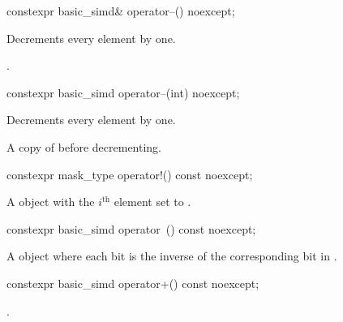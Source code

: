 \begin{itemdecl}
constexpr basic_simd& operator--() noexcept;
\end{itemdecl}

\begin{itemdescr}
  \pnum{}

  \pnum\effects
  Decrements every element by one.

  \pnum\returns
  .
\end{itemdescr}

\begin{itemdecl}
constexpr basic_simd operator--(int) noexcept;
\end{itemdecl}

\begin{itemdescr}
  \pnum{}

  \pnum\effects
  Decrements every element by one.

  \pnum\returns
  A copy of  before decrementing.
\end{itemdescr}

\begin{itemdecl}
constexpr mask_type operator!() const noexcept;
\end{itemdecl}

\begin{itemdescr}
  \pnum{}

  \pnum\returns
  A  object with the $i^\text{th}$ element set to  \foralli.
\end{itemdescr}

\begin{itemdecl}
constexpr basic_simd operator~() const noexcept;
\end{itemdecl}

\begin{itemdescr}
  \pnum{}

  \pnum\returns
  A  object where each bit is the inverse of the corresponding bit in .
\end{itemdescr}

\begin{itemdecl}
constexpr basic_simd operator+() const noexcept;
\end{itemdecl}

\begin{itemdescr}
  \pnum{}

  \pnum\returns
  .
\end{itemdescr}

